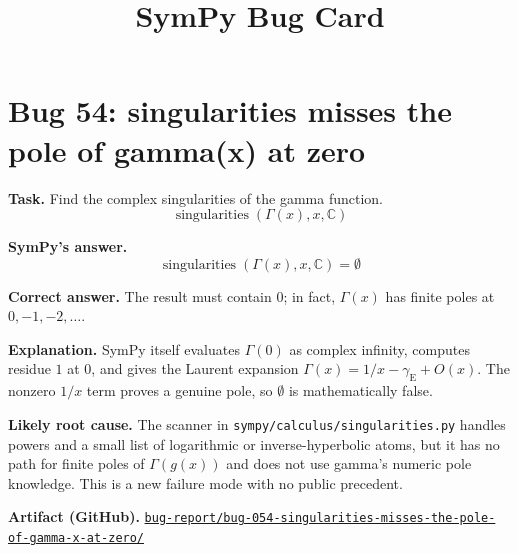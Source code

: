\documentclass[11pt]{article}
\title{SymPy Bug Card}
\date{}
\newcommand{\artifactrepo}{https://github.com/TODO-org/TODO-repo}
\newcommand{\bugbundle}[1]{\href{\artifactrepo/tree/main/bug-report/#1}{\nolinkurl{bug-report/#1/}}}
\begin{document}
\author{}
\maketitle

\section*{Bug 54: singularities misses the pole of gamma(x) at zero}

\begin{counterexamplebox}
\textbf{Task.} Find the complex singularities of the gamma function.
\[
\operatorname{singularities}(\Gamma(x), x, \mathbb{C})
\]

\medskip
\textbf{SymPy's answer.}
\[
\operatorname{singularities}(\Gamma(x), x, \mathbb{C})=\emptyset
\]

\medskip
\textbf{Correct answer.} The result must contain \(0\); in fact, \(\Gamma(x)\) has finite poles at \(0,-1,-2,\ldots\).

\medskip
\textbf{Explanation.} SymPy itself evaluates \(\Gamma(0)\) as complex infinity, computes residue \(1\) at \(0\), and gives the Laurent expansion \(\Gamma(x)=1/x-\gamma_{\mathrm{E}}+O(x)\). The nonzero \(1/x\) term proves a genuine pole, so \(\emptyset\) is mathematically false.

\medskip
\textbf{Likely root cause.} The scanner in \nolinkurl{sympy/calculus/singularities.py} handles powers and a small list of logarithmic or inverse-hyperbolic atoms, but it has no path for finite poles of \(\Gamma(g(x))\) and does not use gamma's numeric pole knowledge. This is a new failure mode with no public precedent.

\medskip
\textbf{Artifact (GitHub).} \bugbundle{bug-054-singularities-misses-the-pole-of-gamma-x-at-zero}
\end{counterexamplebox}
\end{document}

